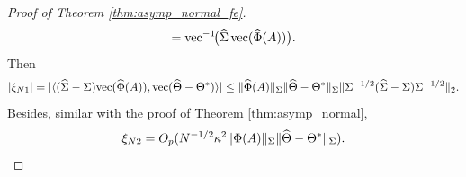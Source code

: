 \documentclass[authoryear,preprint,review,12pt]{elsarticle}
\begin{document}
\begin{proof}[Proof of Theorem \ref{thm:asymp_normal_fe}]
\[	= \mathrm{vec}^{-1}\!\big(\widehat{\Sigma}\,\mathrm{vec}(\widehat{\Phi}(A))\big).\]
	Then
	\[
	|\xi_{N1}| =  |\langle (\widehat\Sigma - \Sigma)\mathrm{vec}(\widehat{\Phi}(A)) , \mathrm{vec}(\widehat\Theta - \Theta^\ast) \rangle |  \leq \|\widehat{\Phi}(A)\|_{\Sigma} \|\widehat\Theta - \Theta^\ast\|_{\Sigma} \|\Sigma^{-1/2}(\widehat\Sigma - \Sigma)\Sigma^{-1/2} \|_2. 
	\]
	Besides, similar with the proof of Theorem \ref{thm:asymp_normal},  
	\[\xi_{N2} = O_p(N^{-1/2}\kappa^2 \|\Phi(A)\|_{\Sigma} \|\widehat\Theta - \Theta^\ast\|_{\Sigma}).\] 

\end{proof}
\end{document}

